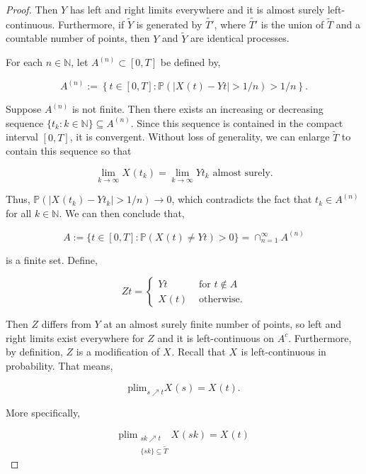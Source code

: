 \documentclass[12pt]{article}
\newcommand{\mb}{\mathbb}
\newcommand{\ra}{\rightarrow}
\newcommand{\te}{\text}
\newcommand{\ind}{\hspace{24pt}}
\newcommand{\pr}{\mb{P}}							%
\newcommand{\T}{T}								%
\renewcommand{\t}{t}							%
\renewcommand{\tt}{s}							%
\newcommand{\X}{X}								%
\newcommand{\cind}[1]{_{#1}}					%
\newcommand{\tp}[1]{(#1)}						%
\newcommand{\tip}[1]{#1}						%
\newcommand{\sln}[1]{^{(#1)}}					%
\newcommand{\alt}[1]{\widetilde{#1}}			%
\newcommand{\indx}[1]{_{#1}}					%
\newcommand{\XX}{Y}								%
\newcommand{\XXX}{Z}							%
\renewcommand{\it}{k}							%
\newcommand{\Tset}{\alt{T}}						%
\newcommand{\typset}{A}							%
\begin{document}
\begin{proof}
Then \(\XX{}{}\) has left and right limits everywhere and it is almost surely left-continuous. Furthermore, if \(\alt{\XX{}{}}\) is generated by \(\alt{T'}\), where \(\alt{T'}\) is the union of \(\Tset\) and a countable number of points, then \(\XX{}{}\) and \(\alt{\XX{}{}}\) are identical processes. 

\ind For each \(n \in \mb{N}\), let \(\typset\sln{n} \subset [0,\T]\) be defined by,

\[\typset\sln{n} := \left\{\t\in [0,\T]: \pr\left(|\X\cind{}\tp{\t} - \XX{}{\t}| > 1/n\right) > 1/n\right\}.\] 

Suppose \(\typset\sln{n}\) is not finite. Then there exists an increasing or decreasing sequence \(\{\t\indx{\it}:\it\in \mb{N}\}\subseteq \typset\sln{n}\). Since this sequence is contained in the compact interval \([0,\T]\), it is convergent. Without loss of generality, we can enlarge \(\Tset\) to contain this sequence so that

\[\lim_{\it \ra\infty} \X\cind{}\tp{\t\indx{\it}} = \lim_{\it\ra\infty} \XX{}{\t\indx{\it}} \te{ almost surely.}\]

Thus, \(\pr(|\X\cind{}\tp{\t\indx{\it}} - \XX{}{\t\indx{\it}}| > 1/n) \ra 0\), which contradicts the fact that \(\t\indx{\it} \in \typset\sln{n}\) for all \(\it\in\mb{N}\). We can then conclude that,

\[\typset:= \{\t\in [0,\T]: \pr(\X\cind{}\tp{\t} \neq \XX{}{\t}) > 0\} = \cap_{n = 1}^\infty \typset\sln{n}\]

is a finite set. Define,

\[\XXX{}{\t}= \begin{cases}
\XX{}{\t} &\te{ for } \t \notin \typset\\
\X\cind{}\tp{\t} &\te{ otherwise.}
\end{cases}\]

Then \(\XXX{}{}\) differs from \(\XX{}{}\) at an almost surely finite number of points, so left and right limits exist everywhere for \(\XXX{}{}\) and it is left-continuous on \(\typset^c\). Furthermore, by definition, \(\XXX{}{}\) is a modification of \(\X\cind{}\tip{}\). Recall that \(\X\cind{}\tip{}\) is left-continuous in probability. That means,

\[\te{plim}_{\tt\nearrow \t} \X\cind{}\tp{\tt} = \X\cind{}\tp{\t}.\]

More specifically,

\[\te{plim}_{\substack{\tt{\it}\nearrow \t\\\{\tt{\it}\} \subseteq \Tset}} \X\cind{}\tp{\tt{\it}} = \X\cind{}\tp{\t}\]


\end{proof}
\end{document}
